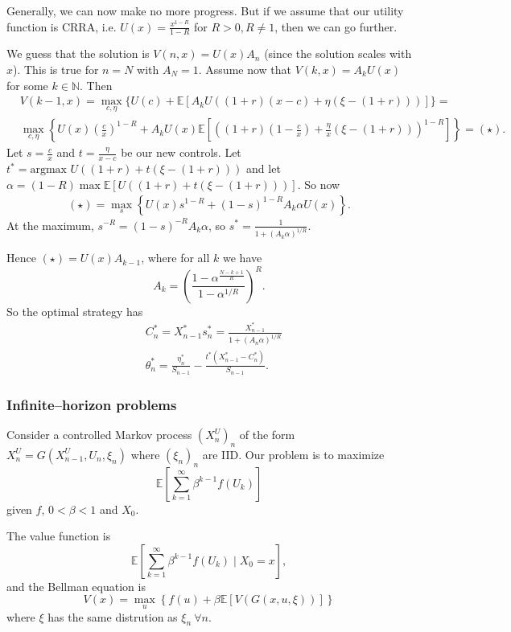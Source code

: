 \documentclass{article}
\theoremstyle{definition}
\begin{document}
Generally, we can now make no more progress. But if we assume that our utility function is CRRA, i.e. $U(x)=\frac{x^{1-R}}{1-R}$ for $R>0, R\neq 1$, then we can go further.
\vspace{1mm}

We guess that the solution is $V(n,x)=U(x)A_n$ (since the solution scales with $x$). This is true for $n=N$ with $A_N=1$. Assume now that $V(k,x)=A_k U(x)$ for some $k \in \mathbb{N}$. Then
\begin{align*}
    &V(k-1,x)= \max_{c,\eta} \{U(c)+\mathbb{E}[A_k U((1+r)(x-c)+\eta(\xi-(1+r)))]\} = \\
    &\max_{c,\eta} \left\{U(x)\left(\frac{c}{x}\right)^{1-R} + A_k U(x)\mathbb{E}\left[\left((1+r)(1-\frac{c}{x})+\frac{\eta}{x}(\xi-(1+r))\right)^{1-R}\right]\right\} = (\star).
\end{align*}
Let $s=\frac{c}{x}$ and $t = \frac{\eta}{x-c}$ be our new controls. Let $t^* = \text{argmax }U((1+r)+t(\xi-(1+r)))$ and let $\alpha = (1-R)\max \mathbb{E}[U((1+r)+t(\xi-(1+r)))]$. So now
\begin{align*}
    (\star) = \max_s \left\{U(x)s^{1-R} + (1-s)^{1-R}A_k \alpha U(x) \right\}.
\end{align*}
At the maximum, $s^{-R}=(1-s)^{-R}A_k \alpha$, so $s^* = \frac{1}{1+(A_k \alpha)^{1/R}}$.
\vspace{1mm}

Hence $(\star)=U(x)A_{k-1}$, where for all $k$ we have
\[
A_{k} = \left(\frac{1-\alpha^{\frac{N-k+1}{R}}}{1-\alpha^{1/R}} \right)^R.
\]
So the optimal strategy has 
\begin{align*}
    &C_n^* = X_{n-1}^* s_n^* = \frac{X^{*}_{n-1}}{1+(A_n \alpha)^{1/R}} \\
    &\theta_n^* = \frac{\eta_n^*}{S_{n-1}}- \frac{t^* (X_{n-1}^*-C_n^*)}{S_{n-1}}.
\end{align*}
\subsubsection{Infinite--horizon problems}
Consider a controlled Markov process $(X_n^U)_n$ of the form $X_n^U = G(X_{n-1}^U,U_n,\xi_n)$ where $(\xi_n)_n$ are IID. Our problem is to maximize \[
\mathbb{E}\left[\sum_{k=1}^{\infty} \beta^{k-1}f(U_k)\right]
\]
given $f$, $0<\beta<1$ and $X_0$.
\vspace{1mm}

The value function is $$\mathbb{E}\left[\sum_{k=1}^{\infty} \beta^{k-1}f(U_k) \mid  X_0 = x\right],$$
and the Bellman equation is \[
V(x) = \max_{u} \left\{f(u)+\beta \mathbb{E}[V(G(x,u,\xi))] \right\}
\]
where $\xi$ has the same distrution as $\xi_n ~\forall n$.
\end{document}
